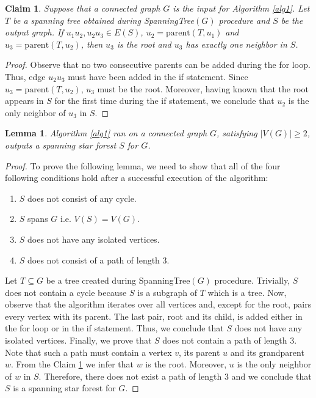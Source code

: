 \documentclass[en]{pracamgr}
\newtheorem{lemma}{Lemma}
\newtheorem{claim}{Claim}
\theoremstyle{definition}
\begin{document}
\begin{claim}\label{ssf root}
	Suppose that a connected graph $G$ is the input for Algorithm \ref{alg1}. Let $T$ be a spanning tree obtained during \textrm{SpanningTree}$(G)$ procedure and $S$ be the output graph. If $u_1 u_2,u_2 u_3 \in E(S)$, $u_2 = \textrm{parent}(T,u_1)$ and $u_3=\textrm{parent}(T,u_2)$, then $u_3$ is the root and $u_3$ has exactly one neighbor in $S$.
\end{claim}

\begin{proof}
	Observe that no two consecutive parents can be added during the for loop. Thus, edge $u_2 u_3$ must have been added in the if statement. Since $u_3 = \textrm{parent}(T,u_2)$, $u_3$ must be the root. Moreover, having known that the root appears in $S$ for the first time during the if statement, we conclude that $u_2$ is the only neighbor of $u_3$ in $S$. 
\end{proof}

\begin{lemma}\label{alg1 correctness}
	Algorithm \ref{alg1} ran on a connected graph $G$, satisfying $|V(G)| \geq 2$, outputs a spanning star forest $S$ for $G$.
\end{lemma}

\begin{proof}
	To prove the following lemma, we need to show that all of the four following conditions hold after a successful execution of the algorithm:
	\begin{enumerate}
		\item $S$ does not consist of any cycle.
		\item $S$ spans $G$ i.e. $V(S) = V(G)$.
		\item $S$ does not have any isolated vertices.
		\item $S$ does not consist of a path of length $3$.
	\end{enumerate}
	Let $T \subseteq G$ be a tree created during \textrm{SpanningTree}$(G)$ procedure. Trivially, $S$ does not contain a cycle because $S$ is a subgraph of $T$ which is a tree. Now, observe that the algorithm iterates over all vertices and, except for the root, pairs every vertex with its parent. The last pair, root and its child, is added either in the for loop or in the if statement. Thus, we conclude that $S$ does not have any isolated vertices. Finally, we prove that $S$ does not contain a path of length $3$. Note that such a path must contain a vertex $v$, its parent $u$ and its grandparent $w$. From the Claim \ref{ssf root} we infer that $w$ is the root. Moreover, $u$ is the only neighbor of $w$ in $S$. Therefore, there does not exist a path of length $3$ and we conclude that $S$ is a spanning star forest for $G$. 
\end{proof}
\end{document}
